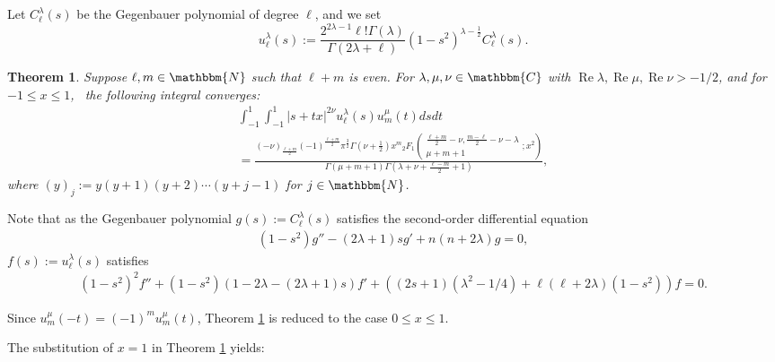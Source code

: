 \documentclass[12pt]{article}
\numberwithin{equation}{section}
\newcommand{\assign}{:=}
\newcommand{\tmop}[1]{\ensuremath{\operatorname{#1}}}
\newtheorem{theorem}[corollary]{Theorem}
\begin{document}
Let $C_{\ell}^{\lambda} (s)$ be the Gegenbauer polynomial of degree $\ell$,
and we set
\[ u_{\ell}^{\lambda} (s) \assign \frac{2^{2 \lambda - 1} \ell ! \Gamma
   (\lambda)}{\Gamma (2 \lambda + \ell)} (1 - s^2)^{\lambda - \frac{1}{2}}
   C_{\ell}^{\lambda} (s) . \]
\begin{theorem}
  \label{main-thm}Suppose $\ell, m \in \mathbbm{N}$ such that $\ell + m$ is
  even. For $\lambda, \mu, \nu \in \mathbbm{C}$ with $\tmop{Re} \lambda,
  \tmop{Re} \mu, \tmop{Re} \nu > - 1 / 2$, and for $- 1 \leqslant x \leqslant
  1$, \ the following integral converges:
  \begin{eqnarray}
    & \displaystyle\int_{- 1}^1 \displaystyle\int_{- 1}^1 | s + t x |^{2 \nu} u_{\ell}^{\lambda} (s)
    u_m^{\mu} (t) d s d t &  \nonumber\\
    & \displaystyle= \frac{(- \nu)_{\frac{\ell + m}{2}} (- 1)^{\frac{\ell + m}{2}}
    \pi^{\frac{3}{2}} \Gamma \left( \nu + \frac{1}{2} \right) x^m{}_2 F_1
    \left( \begin{array}{c}
      \frac{\ell + m}{2} - \nu, \frac{m - \ell}{2} - \nu - \lambda\\
      \mu + m + 1
    \end{array} ; x^2 \right)}{\Gamma (\mu + m + 1) \Gamma \left( \lambda +
    \nu + \frac{\ell - m}{2} + 1 \right)},  \label{eqn:main} & 
  \end{eqnarray}
  where $(y)_j \assign y (y + 1) (y + 2) \cdots (y + j - 1)$ for $j \in
  \mathbbm{N}$.
\end{theorem}

Note that as the Gegenbauer polynomial $g (s) \assign C_{\ell}^{\lambda} (s)$
satisfies the second-order differential equation
\begin{eqnarray}
  & (1 - s^2) g'' - (2 \lambda + 1) s g' + n (n + 2 \lambda) g = 0, & 
  \nonumber
\end{eqnarray}
$f (s) \assign u_{\ell}^{\lambda} (s)$ satisfies
\begin{eqnarray}
  & (1 - s^2)^2 f'' + (1 - s^2) (1 - 2 \lambda - (2 \lambda + 1) s) f' + ((2
  s + 1) (\lambda^2 - 1 / 4) + \ell (\ell + 2 \lambda) (1 - s^2)) f = 0. & 
  \nonumber
\end{eqnarray}
\begin{remark}
  Since $u_m^{\mu} (- t) = (- 1)^m u_m^{\mu} (t)$, Theorem \ref{main-thm} is
  reduced to the case $0 \leqslant x \leqslant 1$.
\end{remark}

The substitution of $x = 1$ in Theorem \ref{main-thm} yields:
\end{document}
